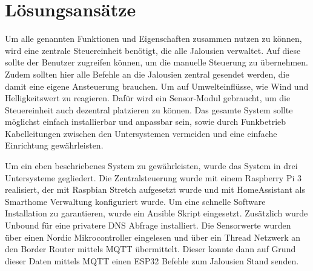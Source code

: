 \section{Lösungsansätze}
Um alle genannten Funktionen und Eigenschaften zusammen nutzen zu können, wird eine zentrale Steuereinheit benötigt, die alle Jalousien verwaltet. Auf diese sollte der Benutzer zugreifen können, um die manuelle Steuerung zu übernehmen. Zudem sollten hier alle Befehle an die Jalousien zentral gesendet werden, die damit eine eigene Ansteuerung brauchen. Um auf Umwelteinflüsse, wie Wind und Helligkeitswert zu reagieren. Dafür wird ein Sensor-Modul gebraucht, um die Steuereinheit auch dezentral platzieren zu können. Das gesamte System sollte möglichst einfach installierbar und anpassbar sein, sowie durch Funkbetrieb Kabelleitungen zwischen den Untersystemen vermeiden und eine einfache Einrichtung gewährleisten.

Um ein eben beschriebenes System zu gewährleisten, wurde das System in drei Untersysteme gegliedert. Die Zentralsteuerung wurde mit einem Raspberry Pi 3 realisiert, der mit Raspbian Stretch aufgesetzt wurde und mit HomeAssistant als Smarthome Verwaltung konfiguriert wurde. Um eine schnelle Software Installation zu garantieren, wurde ein Ansible Skript eingesetzt. Zusätzlich wurde Unbound für eine privatere DNS Abfrage installiert. Die Sensorwerte wurden über einen Nordic Mikrocontroller eingelesen und über ein Thread Netzwerk an den Border Router mittels MQTT übermittelt. Dieser konnte dann auf Grund dieser Daten mittels MQTT einen ESP32 Befehle zum Jalousien Stand senden.